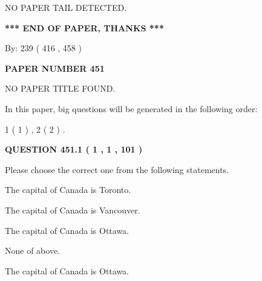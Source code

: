 \documentclass[12pt]{article}
\begin{document}
   
   
   
\vspace{2.0in} NO PAPER TAIL DETECTED.
   
   
   
   
\vspace{1.0in} 
{\textbf{\large{ *** END OF PAPER, THANKS *** }}} 
   
   
\hspace{1.0in} By: 
 239 ( 416 ,  458 )
   
   
   
   
\newpage 
\setcounter{page}{ 
   451001 } 
   
   
   
   
 {\textbf{ \Large{ PAPER NUMBER  451  }}}
   
   
\vspace{0.2in}
   
   
   
   
   
   
 NO PAPER TITLE FOUND.
   
   
   
\vspace{0.2in}
   
In this paper, big questions will be generated in the following order: 
   
   
   1 ( 1 )
 ,
   2 ( 2 )
 .
  
\vspace{0.2in}
  
{\textbf{\Large{QUESTION
451.1 
 ( 1 , 1 , 101 )
}}}
  
  
Please choose the correct one from the following statements.
 
 
The capital of Canada is Toronto.
 
 
The capital of Canada is Vancouver.
 
 
The capital of Canada is Ottawa.
 
 
 None of above.
 
 
\noindent{}
 
 
The capital of Canada is Ottawa.
 
 
\noindent{}
 
\end{document}
